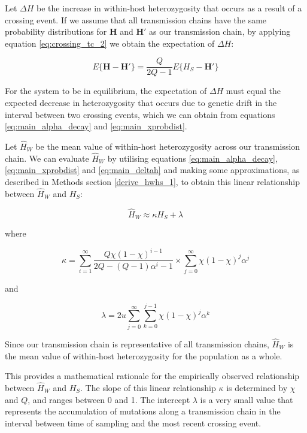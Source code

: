 \documentclass[_main.tex]{subfiles}
\begin{document}
Let $\Delta H$ be the increase in within-host heterozygosity that occurs as a result of a crossing event.  If we assume that all transmission chains have the same probability distributions for $\mathbf{H}$ and $\mathbf{H'}$ as our transmission chain, by applying equation \ref{eq:crossing_tc_2} we obtain the expectation of $\Delta H$:

\begin{equation}
\label{eq:main_deltah}
E \{ \mathbf{H} - \mathbf{H'} \} = \frac{Q}{2Q-1} E\{ H_S  - \mathbf{H'} \}
\end{equation}

For the system to be in equilibrium, the expectation of $\Delta H$ must equal the expected decrease in heterozygosity that occurs due to genetic drift in the interval between two crossing events, which we can obtain from equations \ref{eq:main_alpha_decay} and \ref{eq:main_xprobdist}. 

Let $\widehat{H}_W$ be the mean value of within-host heterozygosity across our transmission chain. We can evaluate $\widehat{H}_W$ by utilising equations \ref{eq:main_alpha_decay}, \ref{eq:main_xprobdist} and \ref{eq:main_deltah} and making some approximations, as described in Methods section \ref{derive_hwhs_1}, to obtain this linear relationship between $\widehat{H}_W$ and $H_S$: 

\begin{equation}
\label{eq:main_hwhs}
\widehat{H}_W \approx \kappa H_S + \lambda
\end{equation}

where

\begin{equation*}
\kappa =
\sum_{i=1}^\infty \frac{Q \chi (1-\chi)^{i-1}}{ 2Q - (Q-1) \alpha^i - 1}
\times
\sum_{j=0}^\infty \chi (1 - \chi)^j \alpha^j
\end{equation*}

and

\begin{equation*}
\lambda = 2u \sum_{j=0}^\infty \sum_{k=0}^{j-1}  \chi (1- \chi)^j \alpha^k
\end{equation*}

Since our transmission chain is representative of all transmission chains, $\widehat{H}_W$ is the mean value of within-host heterozygosity for the population as a whole.

This provides a mathematical rationale for the empirically observed relationship between $\widehat{H}_W$ and $H_S$.   The slope of this linear relationship $\kappa$ is determined by $\chi$ and $Q$, and ranges between 0 and 1.  The intercept $\lambda$ is a very small value that represents the accumulation of mutations along a transmission chain in the interval between time of sampling and the most recent crossing event.
\end{document}
